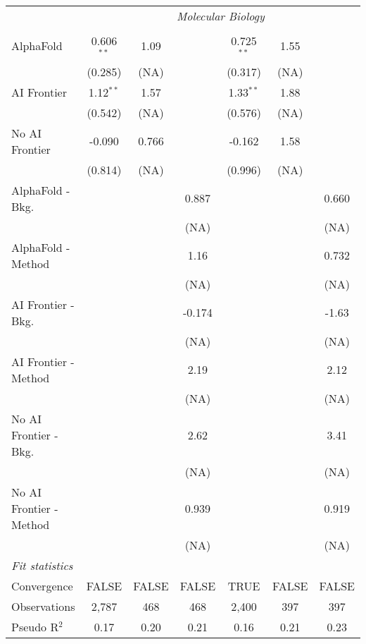 \begin{tabular}{lcccccc}
 & \multicolumn{6}{c}{\textit{Molecular Biology}} \\ \\
   AlphaFold               & 0.606$^{**}$ & 1.09  &        & 0.725$^{**}$ & 1.55  &   \\   
                           & (0.285)      & (NA)  &        & (0.317)      & (NA)  &   \\   
   AI Frontier             & 1.12$^{**}$  & 1.57  &        & 1.33$^{**}$  & 1.88  &   \\   
                           & (0.542)      & (NA)  &        & (0.576)      & (NA)  &   \\   
   No AI Frontier          & -0.090       & 0.766 &        & -0.162       & 1.58  &   \\   
                           & (0.814)      & (NA)  &        & (0.996)      & (NA)  &   \\   
   AlphaFold - Bkg.        &              &       & 0.887  &              &       & 0.660\\   
                           &              &       & (NA)   &              &       & (NA)\\   
   AlphaFold - Method      &              &       & 1.16   &              &       & 0.732\\   
                           &              &       & (NA)   &              &       & (NA)\\   
   AI Frontier - Bkg.      &              &       & -0.174 &              &       & -1.63\\   
                           &              &       & (NA)   &              &       & (NA)\\   
   AI Frontier - Method    &              &       & 2.19   &              &       & 2.12\\   
                           &              &       & (NA)   &              &       & (NA)\\   
   No AI Frontier - Bkg.   &              &       & 2.62   &              &       & 3.41\\   
                           &              &       & (NA)   &              &       & (NA)\\   
   No AI Frontier - Method &              &       & 0.939  &              &       & 0.919\\   
                           &              &       & (NA)   &              &       & (NA)\\   
   \midrule
   \emph{Fit statistics}\\
   Convergence             &FALSE         & FALSE & FALSE  & TRUE         & FALSE & FALSE\\  
   Observations            & 2,787        & 468   & 468    & 2,400        & 397   & 397\\  
   Pseudo R$^2$            & 0.17         & 0.20  & 0.21   & 0.16         & 0.21  & 0.23\\  
   

\end{tabular}
